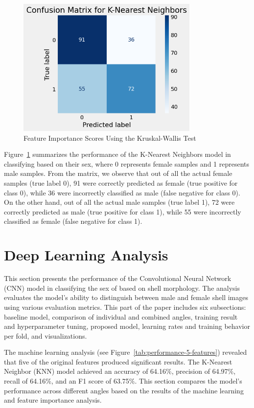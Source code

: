 \begin{figure}[!htbp]
	\centering
	\includegraphics[width=0.8\textwidth]{figures/confusion_matrix_ml.png}
	\caption{Feature Importance Scores Using the Kruskal-Wallis Test}
	\label{fig:cm_ml}
\end{figure}

Figure~\ref{fig:cm_ml} summarizes the performance of the K-Nearest Neighbors model in classifying \Tgranosa based on their sex, where 0 represents female samples and 1 represents male samples. From the matrix, we observe that out of all the actual female samples (true label 0), 91 were correctly predicted as female (true positive for class 0), while 36 were incorrectly classified as male (false negative for class 0). On the other hand, out of all the actual male samples (true label 1), 72 were correctly predicted as male (true positive for class 1), while 55 were incorrectly classified as female (false negative for class 1).

\section{Deep Learning Analysis}
This section presents the performance of the Convolutional Neural Network (CNN) model in classifying the sex of \Tgranosa based on shell morphology. The analysis evaluates the model's ability to distinguish between male and female shell images using various evaluation metrics. This part of the paper includes six subsections: baseline model, comparison of individual and combined angles, training result and hyperparameter tuning, proposed model, learning rates and training behavior per fold, and visualizations.

The machine learning analysis (see Figure~\ref{tab:performance-5-features}) revealed that five of the original features produced significant results. The K-Nearest Neighbor (KNN) model achieved an accuracy of 64.16\%, precision of 64.97\%, recall of 64.16\%, and an F1 score of 63.75\%. This section compares the model's performance across different angles based on the results of the machine learning and feature importance analysis.

